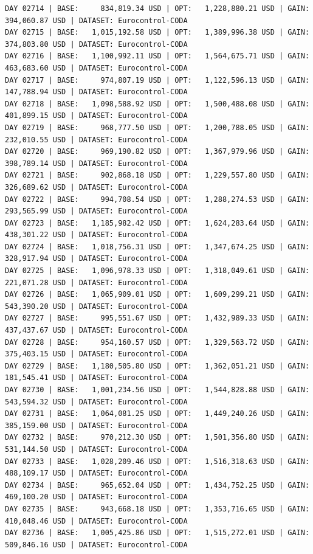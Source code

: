 \documentclass[11pt,a4paper]{article}
\begin{document}
\begin{verbatim}
DAY 02714 | BASE:     834,819.34 USD | OPT:   1,228,880.21 USD | GAIN: 394,060.87 USD | DATASET: Eurocontrol-CODA
DAY 02715 | BASE:   1,015,192.58 USD | OPT:   1,389,996.38 USD | GAIN: 374,803.80 USD | DATASET: Eurocontrol-CODA
DAY 02716 | BASE:   1,100,992.11 USD | OPT:   1,564,675.71 USD | GAIN: 463,683.60 USD | DATASET: Eurocontrol-CODA
DAY 02717 | BASE:     974,807.19 USD | OPT:   1,122,596.13 USD | GAIN: 147,788.94 USD | DATASET: Eurocontrol-CODA
DAY 02718 | BASE:   1,098,588.92 USD | OPT:   1,500,488.08 USD | GAIN: 401,899.15 USD | DATASET: Eurocontrol-CODA
DAY 02719 | BASE:     968,777.50 USD | OPT:   1,200,788.05 USD | GAIN: 232,010.55 USD | DATASET: Eurocontrol-CODA
DAY 02720 | BASE:     969,190.82 USD | OPT:   1,367,979.96 USD | GAIN: 398,789.14 USD | DATASET: Eurocontrol-CODA
DAY 02721 | BASE:     902,868.18 USD | OPT:   1,229,557.80 USD | GAIN: 326,689.62 USD | DATASET: Eurocontrol-CODA
DAY 02722 | BASE:     994,708.54 USD | OPT:   1,288,274.53 USD | GAIN: 293,565.99 USD | DATASET: Eurocontrol-CODA
DAY 02723 | BASE:   1,185,982.42 USD | OPT:   1,624,283.64 USD | GAIN: 438,301.22 USD | DATASET: Eurocontrol-CODA
DAY 02724 | BASE:   1,018,756.31 USD | OPT:   1,347,674.25 USD | GAIN: 328,917.94 USD | DATASET: Eurocontrol-CODA
DAY 02725 | BASE:   1,096,978.33 USD | OPT:   1,318,049.61 USD | GAIN: 221,071.28 USD | DATASET: Eurocontrol-CODA
DAY 02726 | BASE:   1,065,909.01 USD | OPT:   1,609,299.21 USD | GAIN: 543,390.20 USD | DATASET: Eurocontrol-CODA
DAY 02727 | BASE:     995,551.67 USD | OPT:   1,432,989.33 USD | GAIN: 437,437.67 USD | DATASET: Eurocontrol-CODA
DAY 02728 | BASE:     954,160.57 USD | OPT:   1,329,563.72 USD | GAIN: 375,403.15 USD | DATASET: Eurocontrol-CODA
DAY 02729 | BASE:   1,180,505.80 USD | OPT:   1,362,051.21 USD | GAIN: 181,545.41 USD | DATASET: Eurocontrol-CODA
DAY 02730 | BASE:   1,001,234.56 USD | OPT:   1,544,828.88 USD | GAIN: 543,594.32 USD | DATASET: Eurocontrol-CODA
DAY 02731 | BASE:   1,064,081.25 USD | OPT:   1,449,240.26 USD | GAIN: 385,159.00 USD | DATASET: Eurocontrol-CODA
DAY 02732 | BASE:     970,212.30 USD | OPT:   1,501,356.80 USD | GAIN: 531,144.50 USD | DATASET: Eurocontrol-CODA
DAY 02733 | BASE:   1,028,209.46 USD | OPT:   1,516,318.63 USD | GAIN: 488,109.17 USD | DATASET: Eurocontrol-CODA
DAY 02734 | BASE:     965,652.04 USD | OPT:   1,434,752.25 USD | GAIN: 469,100.20 USD | DATASET: Eurocontrol-CODA
DAY 02735 | BASE:     943,668.18 USD | OPT:   1,353,716.65 USD | GAIN: 410,048.46 USD | DATASET: Eurocontrol-CODA
DAY 02736 | BASE:   1,005,425.86 USD | OPT:   1,515,272.01 USD | GAIN: 509,846.16 USD | DATASET: Eurocontrol-CODA

\end{verbatim}
\end{document}

